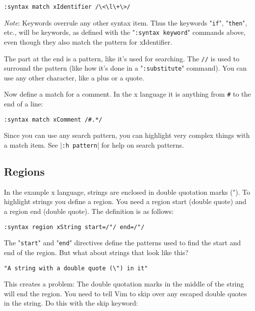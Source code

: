\begin{Verbatim}[samepage=true]
 :syntax match xIdentifier /\<\l\+\>/
\end{Verbatim}
 
\emph{Note}: Keywords overrule any other syntax item.
Thus the keywords "\texttt{if}", "\texttt{then}", etc., will be keywords, as defined with the "\texttt{:syntax keyword}" commands above, even though they also match the pattern for xIdentifier.

The part at the end is a pattern, like it's used for searching.
The \texttt{//} is used to surround the pattern (like how it's done in a "\texttt{:substitute}" command).
You can use any other character, like a plus or a quote.

Now define a match for a comment.
In the x language it is anything from \texttt{\#} to the end of a line:

\begin{Verbatim}[samepage=true]
 :syntax match xComment /#.*/
\end{Verbatim}

Since you can use any search pattern, you can highlight very complex things with a match item.
See |\texttt{:h pattern}| for help on search patterns.
\subsection{Regions}

In the example x language, strings are enclosed in double quotation marks (").
To highlight strings you define a region.
You need a region start (double quote) and a region end (double quote).
The definition is as follows:

\begin{Verbatim}[samepage=true]
 :syntax region xString start=/"/ end=/"/
\end{Verbatim}

The "\texttt{start}" and "\texttt{end}" directives define the patterns used to find the start and end of the region.
But what about strings that look like this?

\begin{Verbatim}[samepage=true]
    "A string with a double quote (\") in it" 
\end{Verbatim}

This creates a problem: The double quotation marks in the middle of the string will end the region.
You need to tell Vim to skip over any escaped double quotes in the string.
Do this with the skip keyword:

